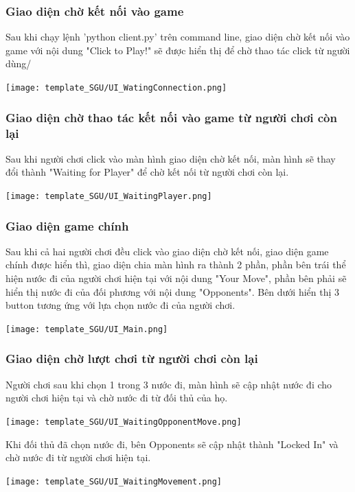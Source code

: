 \documentclass[a4paper]{article}
\begin{document}
\subsubsection{Giao diện chờ kết nối vào game}
Sau khi chạy lệnh 'python client.py' trên command line, giao diện chờ kết nối vào game với nội dung "Click to Play!" sẽ được hiển thị để chờ thao tác click từ người dùng/
\begin{center}
    \texttt{[image: template\_SGU/UI\_WatingConnection.png]}
\end{center}
\subsubsection{Giao diện chờ thao tác kết nối vào game từ người chơi còn lại}
Sau khi người chơi click vào màn hình giao diện chờ kết nối, màn hình sẽ thay đổi thành "Waiting for Player" để chờ kết nối từ người chơi còn lại.
\begin{center}
    \texttt{[image: template\_SGU/UI\_WaitingPlayer.png]}
\end{center}
\subsubsection{Giao diện game chính}
Sau khi cả hai người chơi đều click vào giao diện chờ kết nối, giao diện game chính được hiển thì, giao diện chia màn hình ra thành 2 phần, phần bên trái thể hiện nước đi của người chơi hiện tại với nội dung "Your Move", phần bên phải sẽ hiển thị nước đi của đối phương với nội dung "Opponents". Bên dưới hiển thị 3 button tương ứng với lựa chọn nước đi của người chơi.
\begin{center}
    \texttt{[image: template\_SGU/UI\_Main.png]}
\end{center}
\subsubsection{Giao diện chờ lượt chơi từ người chơi còn lại}
Người chơi sau khi chọn 1 trong 3 nước đi, màn hình sẽ cập nhật nước đi cho người chơi hiện tại và chờ nước đi từ đối thủ của họ.
\begin{center}
    \texttt{[image: template\_SGU/UI\_WaitingOpponentMove.png]}
\end{center}
Khi đối thủ đã chọn nước đi, bên Opponents sẽ cập nhật thành "Locked In" và chờ nước đi từ người chơi hiện tại.
\begin{center}
    \texttt{[image: template\_SGU/UI\_WaitingMovement.png]}
\end{center}
\end{document}
